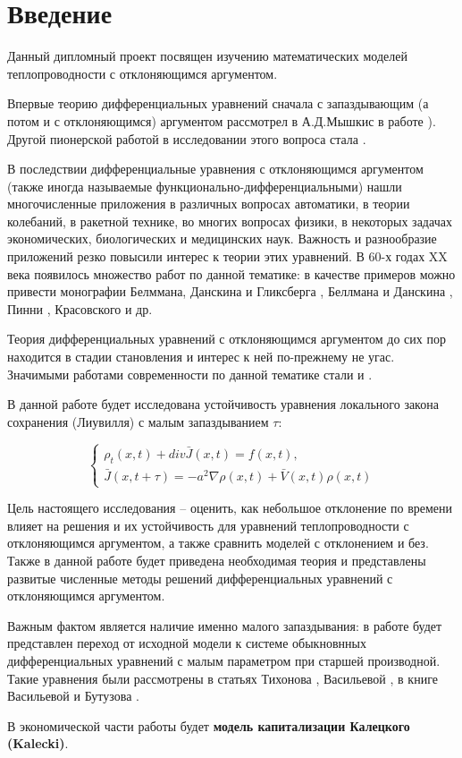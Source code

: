 \section*{Введение}

Данный дипломный проект посвящен изучению математических моделей теплопроводности с отклоняющимся аргументом. 

Впервые теорию дифференциальных уравнений сначала с запаздывающим (а потом и с отклоняющимся) аргументом рассмотрел в А.Д.Мышкис в работе \cite{bib:Myshkis-main}). Другой пионерской работой в исследовании этого вопроса стала \cite{bib:Hahn}.

В последствии дифференциальные уравнения с отклоняющимся аргументом (также иногда называемые функционально-дифференциальными) нашли многочисленные приложения в различных вопросах автоматики, в теории колебаний, в ракетной технике, во многих вопросах физики, в некоторых задачах экономических, биологических и медицинских наук. Важность и разнообразие приложений резко повысили интерес к теории этих уравнений. В 60-х годах XX века появилось множество работ по данной тематике: в качестве примеров можно привести монографии Белммана, Данскина и Гликсберга \cite{bib:Bellman-co}, Беллмана и Данскина \cite{bib:Bellman-Danskin}, Пинни \cite{bib:Pinny}, Красовского \cite{bib:Krasovskii} и др.

Теория дифференциальных уравнений с отклоняющимся аргументом до сих пор находится в стадии становления и интерес к ней по-прежнему не угас. Значимыми работами современности по данной тематике стали \cite{bib:Wu} и \cite{bib:Kolmanovskii-Myshkis}.

В данной работе будет исследована устойчивость уравнения локального закона сохранения (Лиувилля) с малым запаздыванием $\tau$:

\begin{equation*}
\left\{
\begin{aligned}
\rho_t(x,t) + div \bar{J}(x,t) = f(x,t),\\
\bar{J}(x,t+\tau) = -a^2 \nabla \rho(x,t) + \bar{V}(x,t) \rho(x,t)
\end{aligned}
\right.
\end{equation*}

Цель настоящего исследования \--- оценить, как небольшое отклонение по времени влияет на решения и их устойчивость для уравнений теплопроводности с отклоняющимся аргументом, а также сравнить моделей с отклонением и без. Также в данной работе будет приведена необходимая теория и представлены развитые численные методы решений дифференциальных уравнений с отклоняющимся аргументом.

Важным фактом является наличие именно малого запаздывания: в работе будет представлен переход от исходной модели к системе обыкновнных дифференциальных уравнений с малым параметром при старшей производной. Такие уравнения были рассмотрены в статьях Тихонова \cite{bib:Tikhonov_1, bib:Tikhonov_2}, Васильевой \cite{bib:Vasilieva}, в книге Васильевой и Бутузова \cite{bib:Vasilieva-Butuzov}.

В экономической части работы будет \textbf{модель капитализации Калецкого (Kalecki)}\cite{bib:Kalecki}.